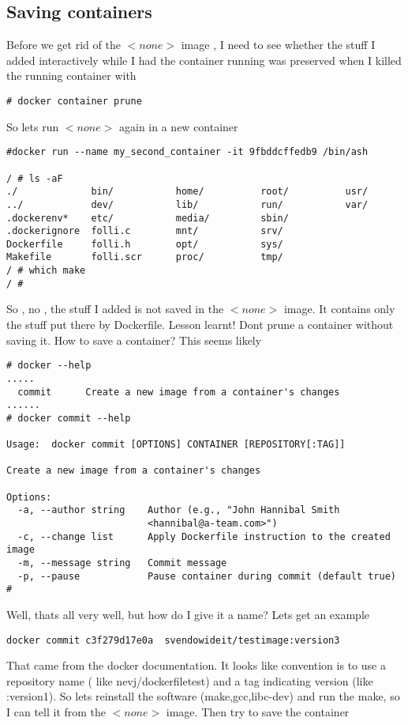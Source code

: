 \documentclass{article}  %
\begin{document}
\subsection{Saving containers}
Before we get rid of the $<none>$ image , I need to see whether the stuff I added interactively while I had the container running was preserved when I killed the running container with 
\begin{verbatim}
# docker container prune
\end{verbatim}
So lets run $<none>$ again in a new container
\begin{verbatim}
#docker run --name my_second_container -it 9fbddcffedb9 /bin/ash

/ # ls -aF
./             bin/           home/          root/          usr/
../            dev/           lib/           run/           var/
.dockerenv*    etc/           media/         sbin/
.dockerignore  folli.c        mnt/           srv/
Dockerfile     folli.h        opt/           sys/
Makefile       folli.scr      proc/          tmp/
/ # which make
/ # 
\end{verbatim}
 So , no , the stuff I added is not saved in the $<none>$ image.
It contains only the stuff put there by Dockerfile. 
Lesson learnt!  Dont prune a container without saving it.
How to save a container?
This seems likely
\begin{verbatim}
# docker --help
.....
  commit      Create a new image from a container's changes
......
# docker commit --help

Usage:  docker commit [OPTIONS] CONTAINER [REPOSITORY[:TAG]]

Create a new image from a container's changes

Options:
  -a, --author string    Author (e.g., "John Hannibal Smith
                         <hannibal@a-team.com>")
  -c, --change list      Apply Dockerfile instruction to the created image
  -m, --message string   Commit message
  -p, --pause            Pause container during commit (default true)
# 
\end{verbatim}
Well, thats all very well, but how do I give it a name? Lets get an example
\begin{verbatim}
docker commit c3f279d17e0a  svendowideit/testimage:version3
\end{verbatim}
That came from the docker documentation. It looks like convention is to use a repository name ( like nevj/dockerfiletest) and a tag indicating version (like :version1). So lets reinstall the software (make,gcc,libc-dev) and run the make, so I can tell it from the $<none>$ image. Then try to save the container
\end{document}

